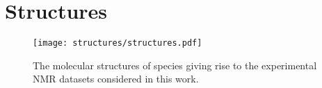 \section{Structures}

\begin{figure}[h!]
    \centering
    \texttt{[image: structures/structures.pdf]}
    \caption[
        The molecular structures of species giving rise to the experimental
        \acs{NMR} datasets considered in this work.
    ]{
        The molecular structures of species giving rise to the experimental
        \acs{NMR} datasets considered in this work.
    }
\end{figure}

